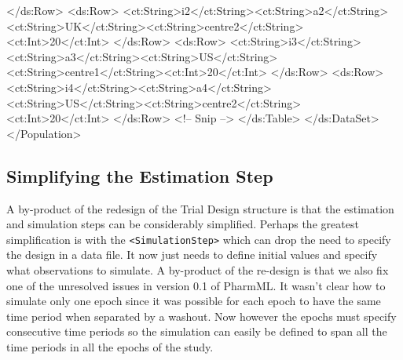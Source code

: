 \documentclass[a4paper,10pt]{article}
\newcommand{\pharmml}{PharmML\xspace}
\newcommand{\xelem}[1]{\texttt{<#1>}\index{XML Element!\texttt{<#1>}}}
\begin{document}
\begin{xmlcode}
                    </ds:Row>
                    <ds:Row>
                        <ct:String>i2</ct:String><ct:String>a2</ct:String><ct:String>UK</ct:String><ct:String>centre2</ct:String><ct:Int>20</ct:Int>
                    </ds:Row>
                    <ds:Row>
                        <ct:String>i3</ct:String><ct:String>a3</ct:String><ct:String>US</ct:String><ct:String>centre1</ct:String><ct:Int>20</ct:Int>
                    </ds:Row>
                    <ds:Row>
                        <ct:String>i4</ct:String><ct:String>a4</ct:String><ct:String>US</ct:String><ct:String>centre2</ct:String><ct:Int>20</ct:Int>
                    </ds:Row>
                    <!-- Snip -->
                </ds:Table>
            </ds:DataSet>            
        </Population>
\end{xmlcode}

\subsection{Simplifying the Estimation Step}

A by-product of the redesign of the Trial Design structure is that the
estimation and simulation steps can be considerably
simplified. Perhaps the greatest simplification is with the
\xelem{SimulationStep} which can drop the need to specify the design
in a data file. It now just needs to define initial values and specify
what observations to simulate. A by-product of the re-design is that
we also fix one of the unresolved issues in version 0.1 of
\pharmml. It wasn't clear how to simulate only one epoch since it was
possible for each epoch to have the same time period when separated by
a washout. Now however the epochs must specify consecutive time
periods so the simulation can easily be defined to span all the time
periods in all the epochs of the study.
\end{document}
